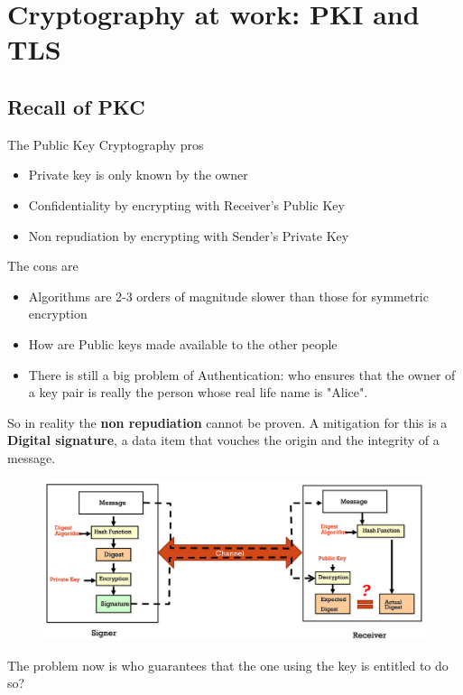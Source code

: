 \section{Cryptography at work: PKI and TLS}
    \subsection{Recall of PKC}
    The Public Key Cryptography pros
    \begin{itemize}
        \item Private key is only known by the owner
        \item Confidentiality by encrypting with Receiver's Public Key
        \item Non repudiation by encrypting with Sender's Private Key
    \end{itemize}
    The cons are
    \begin{itemize}
        \item Algorithms are 2-3 orders of magnitude slower than those for symmetric encryption
        \item How are Public keys made available to the other people
        \item There is still a big problem of Authentication: who ensures that the owner of a key pair is really the person whose real life name is "Alice".
    \end{itemize}  
    So in reality the \textbf{non repudiation} cannot be proven. A mitigation for this is a \textbf{Digital signature}, a data item that vouches the origin and the integrity of a message. 
    
    \begin{figure}[h!]
        \centering
        \includegraphics[scale=0.3]{images/PKCcomm.png}
    \end{figure}
    
    \FloatBarrier
    
    The problem now is who guarantees that the one using the key is entitled to do so?
    
